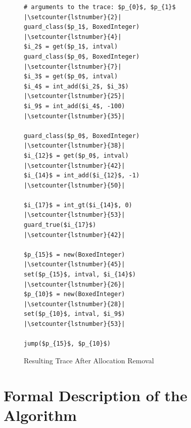 \documentclass[preprint]{sigplanconf}
\begin{document}
\begin{figure}
\begin{lstlisting}[mathescape,numbers=right,escapechar=|,numberstyle = \tiny,numbersep=0pt, numberblanklines=false]
# arguments to the trace: $p_{0}$, $p_{1}$ |\setcounter{lstnumber}{2}|
guard_class($p_1$, BoxedInteger)           |\setcounter{lstnumber}{4}|
$i_2$ = get($p_1$, intval)
guard_class($p_0$, BoxedInteger)           |\setcounter{lstnumber}{7}|
$i_3$ = get($p_0$, intval)
$i_4$ = int_add($i_2$, $i_3$)              |\setcounter{lstnumber}{25}|
$i_9$ = int_add($i_4$, -100)               |\setcounter{lstnumber}{35}|

guard_class($p_0$, BoxedInteger)           |\setcounter{lstnumber}{38}|
$i_{12}$ = get($p_0$, intval)              |\setcounter{lstnumber}{42}|
$i_{14}$ = int_add($i_{12}$, -1)           |\setcounter{lstnumber}{50}|

$i_{17}$ = int_gt($i_{14}$, 0)             |\setcounter{lstnumber}{53}|
guard_true($i_{17}$)                       |\setcounter{lstnumber}{42}|

$p_{15}$ = new(BoxedInteger)               |\setcounter{lstnumber}{45}|
set($p_{15}$, intval, $i_{14}$)            |\setcounter{lstnumber}{26}|
$p_{10}$ = new(BoxedInteger)               |\setcounter{lstnumber}{28}|
set($p_{10}$, intval, $i_9$)               |\setcounter{lstnumber}{53}|

jump($p_{15}$, $p_{10}$)
\end{lstlisting}

\caption{Resulting Trace After Allocation Removal}
\label{fig:step1}
\end{figure}


\section{Formal Description of the Algorithm}
\label{sec:formal}
\end{document}
